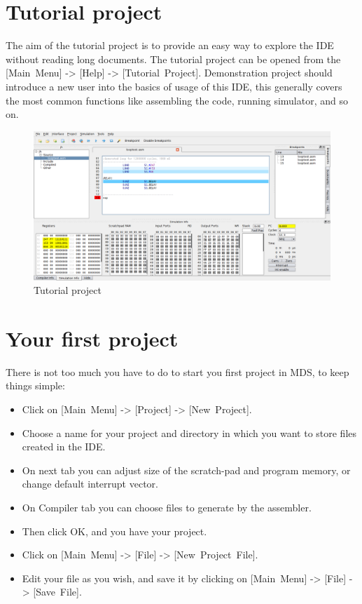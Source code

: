 
\section{Tutorial project}
    The aim of the tutorial project is to provide an easy way to explore the IDE without reading long documents.
    The tutorial project can be opened from the [Main~Menu] -> [Help] -> [Tutorial~Project]. Demonstration project
    should introduce a new user into the basics of usage of this IDE, this generally covers the most common functions
    like assembling the code, running simulator, and so on.
    \begin{figure}[h]
        \centering{}
        \includegraphics[width=\textwidth]{img/demonstration_1.png}
        \caption{Tutorial project}
    \end{figure}

\section{Your first project}
    There is not too much you have to do to start you first project in MDS, to keep things simple:
    \begin{itemize}
        \item Click on [Main~Menu] -> [Project] -> [New~Project].
        \item Choose a name for your project and directory in which you want to store files created in the IDE.
        \item On next tab you can adjust size of the scratch-pad and program memory, or change default interrupt vector.
        \item On Compiler tab you can choose files to generate by the assembler.
        \item Then click OK, and you have your project.
        \item Click on [Main~Menu] -> [File] -> [New~Project~File].
        \item Edit your file as you wish, and save it by clicking on [Main~Menu] -> [File] -> [Save~File].
    \end{itemize}

